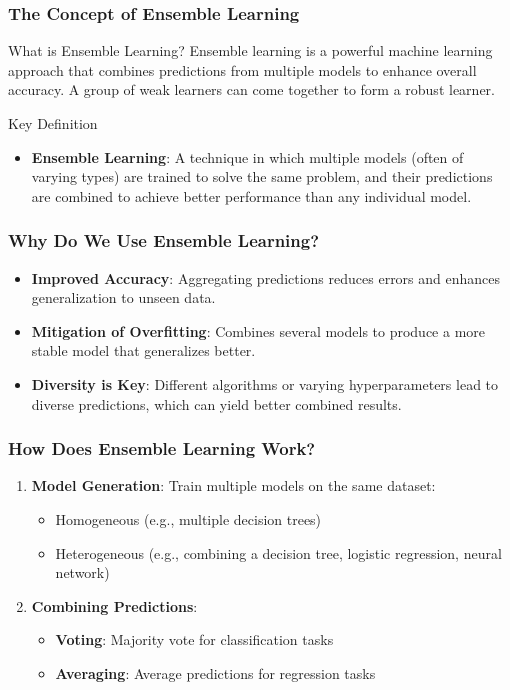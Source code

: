\documentclass[aspectratio=169]{beamer}
\begin{document}
\begin{frame}[fragile]
    \frametitle{The Concept of Ensemble Learning}
    \begin{block}{What is Ensemble Learning?}
        Ensemble learning is a powerful machine learning approach that combines predictions from multiple models to enhance overall accuracy. A group of weak learners can come together to form a robust learner.
    \end{block}
    \begin{block}{Key Definition}
        \begin{itemize}
            \item \textbf{Ensemble Learning}: A technique in which multiple models (often of varying types) are trained to solve the same problem, and their predictions are combined to achieve better performance than any individual model.
        \end{itemize}
    \end{block}
\end{frame}

\begin{frame}[fragile]
    \frametitle{Why Do We Use Ensemble Learning?}
    \begin{itemize}
        \item \textbf{Improved Accuracy}: Aggregating predictions reduces errors and enhances generalization to unseen data.
        \item \textbf{Mitigation of Overfitting}: Combines several models to produce a more stable model that generalizes better.
        \item \textbf{Diversity is Key}: Different algorithms or varying hyperparameters lead to diverse predictions, which can yield better combined results.
    \end{itemize}
\end{frame}

\begin{frame}[fragile]
    \frametitle{How Does Ensemble Learning Work?}
    \begin{enumerate}
        \item \textbf{Model Generation}: Train multiple models on the same dataset:
            \begin{itemize}
                \item Homogeneous (e.g., multiple decision trees)
                \item Heterogeneous (e.g., combining a decision tree, logistic regression, neural network)
            \end{itemize}
        \item \textbf{Combining Predictions}:
            \begin{itemize}
                \item \textbf{Voting}: Majority vote for classification tasks
                \item \textbf{Averaging}: Average predictions for regression tasks
            \end{itemize}
    \end{enumerate}
\end{frame}
\end{document}
